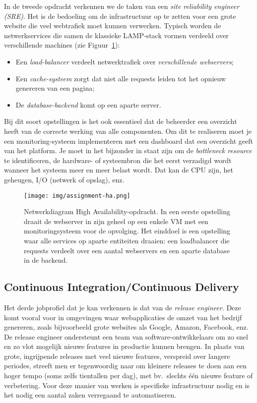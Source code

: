 In de tweede opdracht verkennen we de taken van een \textit{site reliability engineer (SRE)}. Het is de bedoeling om de infrastructuur op te zetten voor een grote website die veel webtrafiek moet kunnen verwerken. Typisch worden de netwerkservices die samen de klassieke LAMP-stack vormen verdeeld over verschillende machines (zie Figuur~\ref{fig:ha}):

\begin{itemize}
\item Een \textit{load-balancer} verdeelt netwerktrafiek over \textit{verschillende webservers};
\item Een \textit{cache-systeem} zorgt dat niet alle requests leiden tot het opnieuw genereren van een pagina;
\item De \textit{database-backend} komt op een aparte server.
\end{itemize}

Bij dit soort opstellingen is het ook essentieel dat de beheerder een overzicht heeft van de correcte werking van alle componenten. Om dit te realiseren moet je een monitoring-systeem implementeren met een dashboard dat een overzicht geeft van het platform. Je moet in het bijzonder in staat zijn om de \textit{bottleneck resource} te identificeren, de hardware- of systeembron die het eerst verzadigd wordt wanneer het systeem meer en meer belast wordt. Dat kan de CPU zijn, het geheugen, I/O (netwerk of opslag), enz.

\begin{figure}
  \centering
  \texttt{[image: img/assignment-ha.png]}
  \caption[Netwerkdiagram High Availability-opdracht]{Netwerkdiagram High Availability-opdracht. In een eerste opstelling draait de webserver in zijn geheel op een enkele VM met een monitoringsysteem voor de opvolging. Het einddoel is een opstelling waar alle services op aparte entiteiten draaien: een loadbalancer die requests verdeelt over een aantal webservers en een aparte database in de backend.}%
  \label{fig:ha}
\end{figure}

\subsection{Continuous Integration/Continuous Delivery}%
\label{subs:continuous-delivery}

Het derde jobprofiel dat je kan verkennen is dat van de \textit{release engineer}. Deze komt vooral voor in omgevingen waar webapplicaties de omzet van het bedrijf genereren, zoals bijvoorbeeld grote websites als Google, Amazon, Facebook, enz. De release engineer ondersteunt een team van software-ontwikkelaars om zo snel en zo vlot mogelijk nieuwe features in productie kunnen brengen. In plaats van grote, ingrijpende releases met veel nieuwe features, verspreid over langere periodes, streeft men er tegenwoordig naar om kleinere releases te doen aan een hoger tempo (soms zelfs tientallen per dag), met bv.~slechts één nieuwe feature of verbetering. Voor deze manier van werken is specifieke infrastructuur nodig en is het nodig een aantal zaken verregaand te automatiseren.

